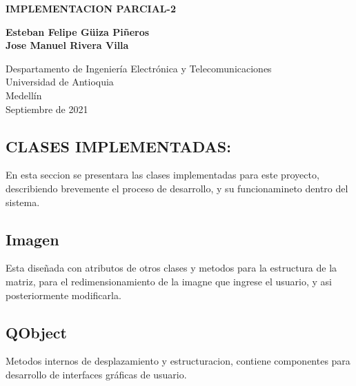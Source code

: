 \documentclass{article}
\begin{document}
\begin{titlepage}
    \begin{center}
        \vspace*{1cm}
            
        \Huge
        \textbf{IMPLEMENTACION PARCIAL-2}
            
        \vspace{0.5cm}
        \LARGE
        
            
        \vspace{5cm}
            
        \textbf{Esteban Felipe Güiza Piñeros}\\
        \textbf{Jose Manuel Rivera Villa }
            
        \vfill
            
        \vspace{0.8cm}
            
        \Large
        Despartamento de Ingeniería Electrónica y Telecomunicaciones\\
        Universidad de Antioquia\\
        Medellín\\
        Septiembre de 2021
            
    \end{center}
\end{titlepage}

\tableofcontents
\vspace{15cm}


\begin{center}
\Huge
\section{CLASES IMPLEMENTADAS: }
\end{center}

\vspace{1cm}

En esta seccion se presentara las clases implementadas para este proyecto, describiendo brevemente  el proceso de desarrollo, y su funcionamineto dentro del sistema.

\subsection{Imagen}
Esta diseñada con atributos de otros clases y metodos para la estructura  de la matriz, para  el redimensionamiento de la imagne que ingrese el usuario, y asi posteriormente modificarla. 
\subsection{QObject}
Metodos internos de desplazamiento y estructuracion, contiene componentes para desarrollo de interfaces gráficas de usuario.
\end{document}
